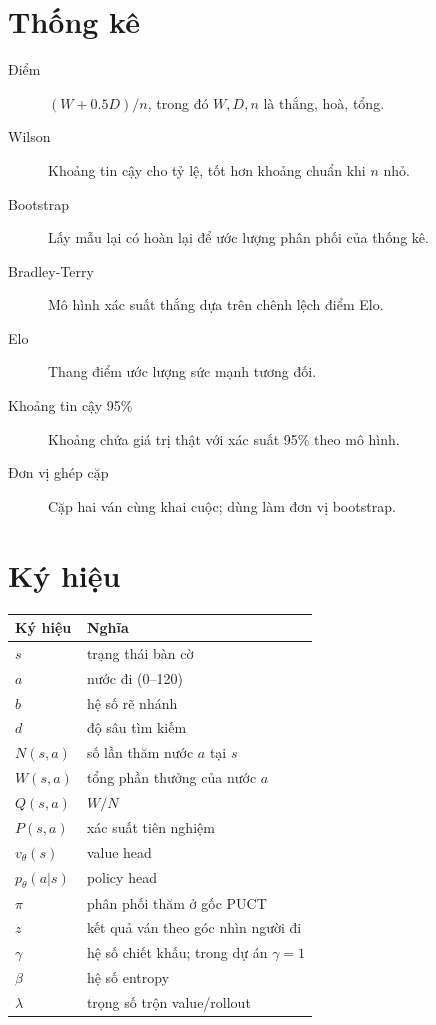 \section{Thống kê}
\begin{description}
  \item[Điểm] $(W+0.5D)/n$, trong đó $W,D,n$ là thắng, hoà, tổng.
  \item[Wilson] Khoảng tin cậy cho tỷ lệ, tốt hơn khoảng chuẩn khi $n$ nhỏ.
  \item[Bootstrap] Lấy mẫu lại có hoàn lại để ước lượng phân phối của thống kê.
  \item[Bradley-Terry] Mô hình xác suất thắng dựa trên chênh lệch điểm Elo.
  \item[Elo] Thang điểm ước lượng sức mạnh tương đối.
  \item[Khoảng tin cậy 95\%] Khoảng chứa giá trị thật với xác suất 95\% theo mô hình.
  \item[Đơn vị ghép cặp] Cặp hai ván cùng khai cuộc; dùng làm đơn vị bootstrap.
\end{description}

\section{Ký hiệu}
\begin{center}\small
\begin{tabular}{@{}ll@{}}
\toprule
\textbf{Ký hiệu} & \textbf{Nghĩa} \\
\midrule
$s$ & trạng thái bàn cờ \\
$a$ & nước đi (0--120) \\
$b$ & hệ số rẽ nhánh \\
$d$ & độ sâu tìm kiếm \\
$N(s,a)$ & số lần thăm nước $a$ tại $s$ \\
$W(s,a)$ & tổng phần thưởng của nước $a$ \\
$Q(s,a)$ & $W/N$ \\
$P(s,a)$ & xác suất tiên nghiệm \\
$v_\theta(s)$ & value head \\
$p_\theta(a|s)$ & policy head \\
$\pi$ & phân phối thăm ở gốc PUCT \\
$z$ & kết quả ván theo góc nhìn người đi \\
$\gamma$ & hệ số chiết khấu; trong dự án $\gamma=1$ \\
$\beta$ & hệ số entropy \\
$\lambda$ & trọng số trộn value/rollout \\
\bottomrule
\end{tabular}
\end{center}